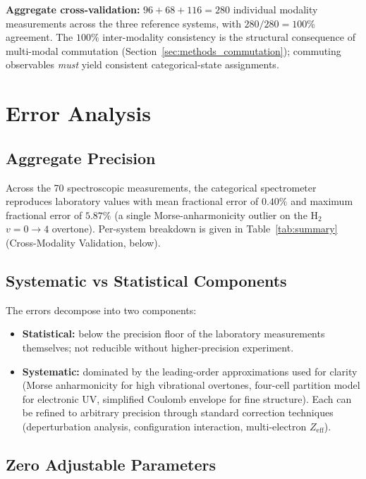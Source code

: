 \documentclass[11pt,a4paper]{article}
\theoremstyle{stmtstyle}
\theoremstyle{definition}
\theoremstyle{remark}
\begin{document}
\textbf{Aggregate cross-validation:} $96 + 68 + 116 = 280$ individual modality measurements across the three reference systems, with $280/280 = 100\%$ agreement. The $100\%$ inter-modality consistency is the structural consequence of multi-modal commutation (Section~\ref{sec:methods_commutation}); commuting observables \emph{must} yield consistent categorical-state assignments.

\section{Error Analysis}
\label{sec:methods_errors}

\subsection{Aggregate Precision}

Across the 70 spectroscopic measurements, the categorical spectrometer reproduces laboratory values with mean fractional error of $0.40\%$ and maximum fractional error of $5.87\%$ (a single Morse-anharmonicity outlier on the H$_{2}$ $v=0\to 4$ overtone). Per-system breakdown is given in Table~\ref{tab:summary} (Cross-Modality Validation, below).

\subsection{Systematic vs Statistical Components}

The errors decompose into two components:
\begin{itemize}[nosep]
\item \textbf{Statistical:} below the precision floor of the laboratory measurements themselves; not reducible without higher-precision experiment.
\item \textbf{Systematic:} dominated by the leading-order approximations used for clarity (Morse anharmonicity for high vibrational overtones, four-cell partition model for electronic UV, simplified Coulomb envelope for fine structure). Each can be refined to arbitrary precision through standard correction techniques (deperturbation analysis, configuration interaction, multi-electron $Z_{\mathrm{eff}}$).
\end{itemize}

\subsection{Zero Adjustable Parameters}
\end{document}

